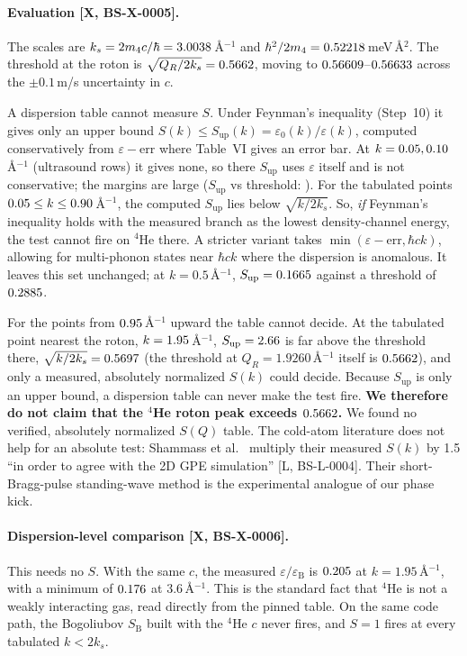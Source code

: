 \documentclass[11pt]{article}
\theoremstyle{remark}
\newcommand{\tier}[1]{\textsf{[#1]}}
\newcommand{\ks}{k_s}
\newcommand{\SB}{S_{\mathrm B}}
\newcommand{\eB}{\varepsilon_{\mathrm B}}
\begin{document}
\paragraph{Evaluation \tier{X, BS-X-0005}.} The scales are $\ks=2m_4c/\hbar=\HeKs$\,\AA$^{-1}$ and
$\hbar^2/2m_4=0.52218$\,meV\,\AA$^2$. The threshold at the roton is $\sqrt{Q_R/2\ks}=\HeThrQR$, moving to
$0.56609$--$0.56633$ across the $\pm0.1$\,m/s uncertainty in $c$.

A dispersion table cannot measure $S$. Under Feynman's inequality (Step~10) it gives only an upper bound
$S(k)\le S_\mathrm{up}(k)=\varepsilon_0(k)/\varepsilon(k)$, computed conservatively from $\varepsilon-\mathrm{err}$
where Table~VI gives an error bar. At $k=0.05, 0.10$\,\AA$^{-1}$ (ultrasound rows) it gives none, so there
$S_\mathrm{up}$ uses $\varepsilon$ itself and is not conservative; the margins are large ($S_\mathrm{up}$ vs threshold:
\HeNoErrMargins).
For the \HeNSilent{} tabulated points $0.05\le k\le0.90$\,\AA$^{-1}$, the computed $S_\mathrm{up}$ lies below
$\sqrt{k/2\ks}$. So, \emph{if} Feynman's inequality holds with the measured branch as the lowest density-channel energy,
the test cannot fire on $^4$He there. A stricter variant takes $\min(\varepsilon-\mathrm{err},\hbar ck)$, allowing for
multi-phonon states near $\hbar ck$ where the dispersion is anomalous. It leaves this set unchanged; at
$k=0.5$\,\AA$^{-1}$, $S_\mathrm{up}=0.1665$ against a threshold of $0.2885$.

For the \HeNUnd{} points from $0.95$\,\AA$^{-1}$ upward the table cannot decide. At the tabulated point nearest
the roton, $k=1.95$\,\AA$^{-1}$, $S_\mathrm{up}=2.66$ is far above the threshold there,
$\sqrt{k/2\ks}=\HeThrRotonTab$ (the threshold at $Q_R=1.9260$\,\AA$^{-1}$ itself is $0.5662$), and only a measured, absolutely normalized $S(k)$ could
decide. Because $S_\mathrm{up}$ is only an upper bound, a dispersion table can never make the test fire. \textbf{We
therefore do not claim that the $^4$He roton peak exceeds $0.5662$.} We found no verified, absolutely normalized $S(Q)$
table. The cold-atom literature does not help for an absolute test: Shammass et al.~\cite{shammass} multiply their
measured $S(k)$ by 1.5 ``in order to agree with the 2D GPE simulation'' \tier{L, BS-L-0004}. Their short-Bragg-pulse
standing-wave method is the experimental analogue of our phase kick.

\paragraph{Dispersion-level comparison \tier{X, BS-X-0006}.} This needs no $S$. With the same $c$, the measured
$\varepsilon/\eB$ is $0.205$ at $k=1.95$\,\AA$^{-1}$, with a minimum of $0.176$ at $3.6$\,\AA$^{-1}$.
This is the standard fact that $^4$He is not a weakly interacting gas, read directly from the pinned table.
On the same code path, the Bogoliubov $\SB$ built with the $^4$He $c$ never fires, and $S=1$ fires at every tabulated
$k<2\ks$.
\end{document}
